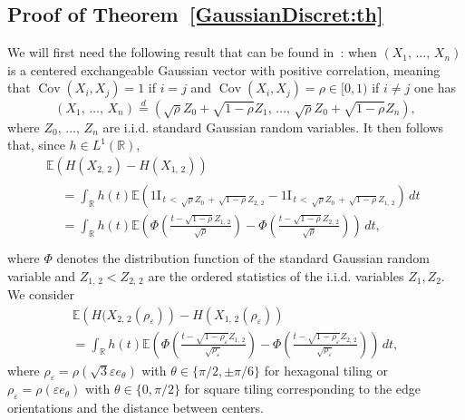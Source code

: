 \documentclass[AHL,Unicode,longabstracts,published]{cedram}
\newcommand{\R}{\mathbb{R}}
\newcommand{\E}{\mathbb{E}}
\newcommand{\ind}{{1\!\!\mathrm{I}}}
\newcommand{\eps}{\varepsilon}
\DeclareMathOperator{\Cov}{Cov}
\begin{document}
\subsection{Proof of Theorem~\ref{GaussianDiscret:th}}\label{App:GaussianDiscret:th}



We will first need the following result that can be found in~\cite[p.~139]{Tong90}: when $(X_1,\,\ldots,\,X_n)$ is a centered exchangeable Gaussian vector with positive correlation, meaning that $\Cov(X_i,X_j)=1$ if $i=j$ and $\Cov(X_i,X_j)=\rho \in [0,1)$ if $i\neq j$ one has
\[
\left(X_1,\,\ldots,\,X_n\right)\stackrel{d}{=}\left(\sqrt{\rho}Z_0+\sqrt{1-\rho}Z_1,\,\ldots,\,\sqrt{\rho}Z_0+\sqrt{1-\rho}Z_n\right),
\]
where $Z_0,\,\ldots,\,Z_n$ are i.i.d. standard Gaussian random variables. It then follows that, since $h\in L^1(\R)$,
\begin{multline*}
\E\left(H(X_{2,\,2}) - H(X_{1,\,2})\right)\\
\begin{aligned}
& = \int_\R h(t) \E \left(
\ind_{\,t\,<\,\sqrt{\rho}Z_0\,+\,\sqrt{1-\rho}Z_{2,\,2}}-\ind_{\,t\,<\,\sqrt{\rho}Z_0\,+\,\sqrt{1-\rho}Z_{1,\,2}}\right) \, dt \\
& = \int_\R h(t) \E\left(\Phi\left(\frac{t-\sqrt{1-\rho}Z_{1,\,2}}{\sqrt{\rho}}\right)-\Phi\left(\frac{t-\sqrt{1-\rho}Z_{2,\,2}}{\sqrt{\rho}}\right)\right)\,dt,\\
\end{aligned}
\end{multline*}
where $\Phi$ denotes the distribution function of the standard Gaussian random variable and $Z_{1,\,2}<Z_{2,\,2}$ are the ordered statistics of the i.i.d. variables $Z_1, Z_2$.\\
We consider
\begin{multline*}
\E\left(H(X_{2,\,2}(\rho_\eps)\right) - H\left(X_{1,\,2}(\rho_\eps)\right)
\\
=\int_\R h(t) \E\left(\Phi\left(\frac{t-\sqrt{1-\rho_\eps}Z_{1,\,2}}{\sqrt{\rho_\eps}}\right)-\Phi\left(\frac{t-\sqrt{1-\rho_\eps}Z_{2,\,2}}{\sqrt{\rho_\eps}}\right)\right)\,dt,
\end{multline*}
where $\rho_\eps=\rho(\sqrt{3}\eps e_{\theta})$ with $\theta\in\{\pi/2,\pm\pi/6\}$ for hexagonal tiling or $\rho_\eps=\rho(\eps e_{\theta})$ with $\theta\in\{0,\pi/2\}$ for square tiling corresponding to the edge orientations and the distance between centers.
\end{document}
